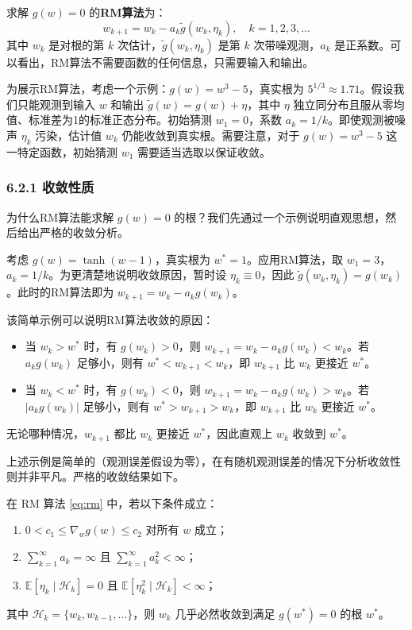 \documentclass[UTF8]{article}
\begin{document}
求解 $g(w) = 0$ 的\textbf{RM算法}为：
\begin{equation}
\label{eq:rm}
w_{k+1} = w_k - a_k \tilde{g}(w_k, \eta_k), \quad k = 1, 2, 3, \dots
\end{equation}
其中 $w_k$ 是对根的第 $k$ 次估计，$\tilde{g}(w_k, \eta_k)$ 是第 $k$ 次带噪观测，$a_k$ 是正系数。可以看出，RM算法不需要函数的任何信息，只需要输入和输出。

为展示RM算法，考虑一个示例：$g(w) = w^3 - 5$，真实根为 $5^{1/3} \approx 1.71$。假设我们只能观测到输入 $w$ 和输出 $\tilde{g}(w) = g(w) + \eta$，其中 $\eta$ 独立同分布且服从零均值、标准差为1的标准正态分布。初始猜测 $w_1 = 0$，系数 $a_k = 1/k$。即使观测被噪声 $\eta_k$ 污染，估计值 $w_k$ 仍能收敛到真实根。需要注意，对于 $g(w) = w^3 - 5$ 这一特定函数，初始猜测 $w_1$ 需要适当选取以保证收敛。

\subsubsection*{6.2.1 收敛性质}

为什么RM算法能求解 $g(w) = 0$ 的根？我们先通过一个示例说明直观思想，然后给出严格的收敛分析。

考虑 $g(w) = \tanh(w - 1)$，真实根为 $w^* = 1$。应用RM算法，取 $w_1 = 3$，$a_k = 1/k$。为更清楚地说明收敛原因，暂时设 $\eta_k \equiv 0$，因此 $\tilde{g}(w_k, \eta_k) = g(w_k)$。此时的RM算法即为 $w_{k+1} = w_k - a_k g(w_k)$。

该简单示例可以说明RM算法收敛的原因：
\begin{itemize}
    \item 当 $w_k > w^*$ 时，有 $g(w_k) > 0$，则 $w_{k+1} = w_k - a_k g(w_k) < w_k$。若 $a_k g(w_k)$ 足够小，则有 $w^* < w_{k+1} < w_k$，即 $w_{k+1}$ 比 $w_k$ 更接近 $w^*$。
    \item 当 $w_k < w^*$ 时，有 $g(w_k) < 0$，则 $w_{k+1} = w_k - a_k g(w_k) > w_k$。若 $|a_k g(w_k)|$ 足够小，则有 $w^* > w_{k+1} > w_k$，即 $w_{k+1}$ 比 $w_k$ 更接近 $w^*$。
\end{itemize}
无论哪种情况，$w_{k+1}$ 都比 $w_k$ 更接近 $w^*$，因此直观上 $w_k$ 收敛到 $w^*$。

上述示例是简单的（观测误差假设为零），在有随机观测误差的情况下分析收敛性则并非平凡。严格的收敛结果如下。

\begin{theorembox}
    在 RM 算法 \eqref{eq:rm} 中，若以下条件成立：
    \begin{enumerate}
        \item $0 < c_1 \leq \nabla_w g(w) \leq c_2$ 对所有 $w$ 成立；
        \item $\displaystyle\sum_{k=1}^{\infty} a_k = \infty$ 且 $\displaystyle\sum_{k=1}^{\infty} a_k^2 < \infty$；
        \item $\mathbb{E}[\eta_k \mid \mathcal{H}_k] = 0$ 且 $\mathbb{E}[\eta_k^2 \mid \mathcal{H}_k] < \infty$；
    \end{enumerate}
    其中 $\mathcal{H}_k = \{w_k, w_{k-1}, \dots\}$，则 $w_k$ 几乎必然收敛到满足 $g(w^*) = 0$ 的根 $w^*$。
\end{theorembox}
\end{document}
